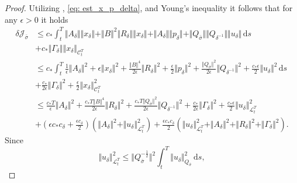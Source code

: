 \documentclass[10pt,a4paper]{amsart}
\begin{document}
\begin{proof}
    Utilizing , \eqref{eq: est_x_p_delta}, and Young's inequality it follows that for any $\epsilon>0$ it holds
    \begin{equation*}
    \begin{aligned}
    	\delta \mathcal{J}_{\bar{\sigma}}
    	&\leq
    	c_* \int_t^T
    		\Vert A_\delta \Vert \Vert x_\delta \Vert
    		+
    		\Vert B \Vert^2 \Vert R_\delta \Vert \Vert x_\delta \Vert
    		+
    		\Vert A_\delta \Vert  \Vert p_\delta \Vert
    		+
    		  \Vert Q_{\bar{\sigma}} \Vert \Vert Q_{\delta^{-1}} \Vert \Vert u_\delta \Vert 
     	\, \mathrm{d}s\\
     	&+
        c_* \Vert \Gamma_\delta \Vert \Vert x_\delta \Vert_{\mathcal{C}_t^T}\\
     	&\leq
     	c_* \int_t^T
     	\frac{1}{\epsilon} \Vert A_\delta \Vert^2
     	+
     	\epsilon \Vert x_\delta \Vert^2
     	+
     	\frac{\Vert B \Vert^4}{2\epsilon} \Vert R_\delta \Vert^2
     	+
     	\frac{\epsilon}{2} \Vert p_\delta \Vert^2 
     	+
     	\frac{\Vert Q_{\bar{\sigma}} \Vert^2}{2 \epsilon} \Vert Q_{\delta^{-1}} \Vert^2
     	+ 
     	\frac{c_* \epsilon}{2} \Vert u_\delta \Vert^2
     	\, \mathrm{d}s\\
     	&+ 
     	\frac{c_*}{2\epsilon} \Vert \Gamma_\delta \Vert^2
     	+   
     	\frac{\epsilon}{2} \Vert x_\delta \Vert_{\mathcal{C}_t^T}^2\\
     	&\leq
     	\frac{c_* T}{\epsilon} \Vert A_\delta \Vert^2
     	+
     	\frac{c_* T \Vert B \Vert^4}{2\epsilon} \Vert R_\delta \Vert^2
     	+
     	\frac{c_* T \Vert Q_{\bar{\sigma}} \Vert^2}{2\epsilon} \Vert Q_{\delta^{-1}} \Vert^2
     	+
     	\frac{c_*}{2\epsilon} \Vert \Gamma_\delta \Vert^2
        + 
     	\frac{c_* \epsilon}{2} \Vert u_\delta \Vert_{\mathcal{L}_t^T}^2\\
     	&+ 
     	(\epsilon c_* c_\delta + \frac{\epsilon c_\delta}{2}) (\Vert A_\delta \Vert^2 + \Vert u_\delta \Vert_{\mathcal{L}_t^T}^2)
     	+ \frac{\epsilon c_* c_\delta}{2} \left(
     	\Vert u_\delta \Vert_{\mathcal{L}_t^T}^2
     	+ 
     	\Vert A_\delta \Vert^2 
     	+ 
     	\Vert R_\delta \Vert^2 
     	+
     	\Vert \Gamma_\delta \Vert^2 
     	\right).
	\end{aligned}  
    \end{equation*}
    Since 
    \begin{equation*}
        \Vert u_\delta \Vert_{\mathcal{L}_t^T}^2 \leq \Vert Q_{\bar{\sigma}}^{-\tfrac{1}{2}} \Vert^2 \int_t^T \Vert u_\delta \Vert_{Q_{\bar{\sigma}}}^2 \, \mathrm{d}s,

\end{equation*}
\end{proof}
\end{document}
